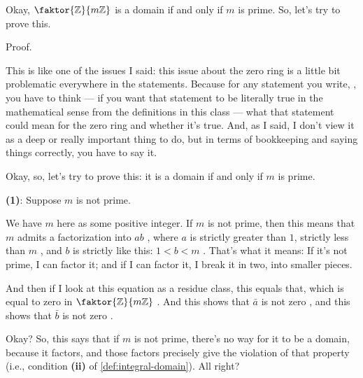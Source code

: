 \begin{proofWrapper}

\begin{speech}[00:17:09 - 00:19:24]
Okay, $\faktor{\mathbb{Z}}{m\mathbb{Z}}$ is a domain if and only if $m$ is prime. So, let's try to prove this.

Proof. 

This is like one of the issues I said: this issue about the zero ring is a little bit problematic everywhere in the statements. Because for any statement you write, , you have to think --- if you want that statement to be literally true in the mathematical sense from the definitions in this class --- what that statement could mean for the zero ring and whether it's true. And, as I said, I don't view it as a deep or really important thing to do, but in terms of bookkeeping and saying things correctly, you have to say it.

Okay, so, let's try to prove this: it is a domain if and only if $m$ is prime.

\textbf{(1)}: Suppose $m$ is not prime. 

We have $m$ here as some positive integer. If $m$ is not prime, then this means that $m$ admits a factorization into $ab$ , where $a$ is strictly greater than $1$, strictly less than $m$ , and $b$ is strictly like this: $1 < b < m$ . That's what it means: If it's not prime, I can factor it; and if I can factor it, I break it in two, into smaller pieces.

And then if I look at this equation as a residue class, this equals that, which is equal to zero in $\faktor{\mathbb{Z}}{m\mathbb{Z}}$ . And this shows that $\bar{a}$ is not zero , and this shows that $\bar{b}$ is not zero .

Okay? So, this says that if $m$ is not prime, there's no way for it to be a domain, because it factors, and those factors precisely give the violation of that property (i.e., condition \textbf{(ii)} of \cref{def:integral-domain}). All right?
\end{speech}


\end{proofWrapper}
